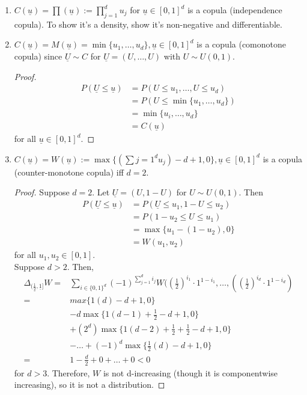\documentclass{article}
\begin{document}
	\begin{myex}{}{}
		\begin{enumerate}
			\item $C(\underline{u})=\prod(\underline{u}):=\prod_{j=1}^{d}u_j$ for $\underline{u}\in[0, 1]^d$ is a copula (independence copula). To show it's a density, show it's non-negative and differentiable.
			
			\item $C(\underline{u})=M(\underline{u})=\min\{u_1, \dots, u_d\}, \underline{u}\in[0, 1]^d$ is a copula (comonotone copula) since $\underline{U}\sim C$ for $\underline{U}=(U, \dots, U)$ with $U\sim U(0, 1)$.
			
			\begin{proof}
				\begin{align*}
					P(\underline{U}\leq\underline{u})&=P(U\leq u_1, \dots, U\leq u_d)\\
					&=P(U\leq\min\{u_1, \dots, u_d\})\\
					&=\min\{u_i, \dots, u_d\}\\
					&=C(\underline{u})
				\end{align*}
				for all $\underline{u}\in[0, 1]^d$.
			\end{proof}
			
			\item $C(\underline{u})=W(\underline{u}):=\max\{(\sum{j=1}^{d}u_j)-d+1, 0\}, \underline{u}\in[0, 1]^d$ is a copula (counter-monotone copula) iff $d=2$.
			
			\begin{proof}
				Suppose $d=2$. Let $\underline{U}=(U, 1-U)$ for $U\sim U(0, 1)$. Then
				\begin{align*}
					P(\underline{U}\leq\underline{u})&=P(\underline{U}\leq u_1, 1-U\leq u_2)\\
					&=P(1-u_2\leq U\leq u_1)\\
					&=\max\{u_1-(1-u_2), 0\}\\
					&=W(u_1, u_2)
				\end{align*}
				for all $u_1, u_2\in[0, 1]$.\\
				
				Suppose $d>2$. Then,
				\begin{align*}
					\Delta_{(\underline{\frac{1}{2}}, \underline{1}]}W=&\sum_{i\in\{0, 1\}^d}(-1)^{\sum_{j=1}^{d}i_j}W((\frac{1}{2})^{i_1}\cdot1^{1-i_1}, \dots, ((\frac{1}{2})^{i_d}\cdot1^{1-i_d})\\
					=&max\{1(d)-d+1, 0\}\\
					&-d\max\{1(d-1)+\frac{1}{2}-d+1, 0\}\\
					&+(2^d)\max\{1(d-2)+\frac{1}{2}+\frac{1}{2}-d+1, 0\}\\
					&-\dots+(-1)^d\max\{\frac{1}{2}(d)-d+1, 0\}\\
					=&1-\frac{d}{2}+0+\dots+0<0
				\end{align*}
				for $d>3$. Therefore, $W$ is not d-increasing (though it is componentwise increasing), so it is not a distribution.
			\end{proof}
		\end{enumerate}
	\end{myex}
	
\end{document}
